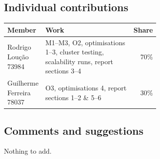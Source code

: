 \documentclass[10pt,a4paper]{article}
\begin{document}
\subsection*{Individual contributions}
\begin{tabular}{@{}lp{0.62\linewidth}r@{}}
\toprule
Member & Work & Share \\
\midrule
Rodrigo Loução 73984 &M1--M3, O2, optimisations 1--3, cluster testing, scalability runs, report sections 3--4 & 70\% \\
Guilherme Ferreira 78037 & O3, optimisations 4, report sections 1--2 \& 5--6 & 30\% \\
\bottomrule
\end{tabular}

\subsection*{Comments and suggestions}
Nothing to add.
\end{document}

